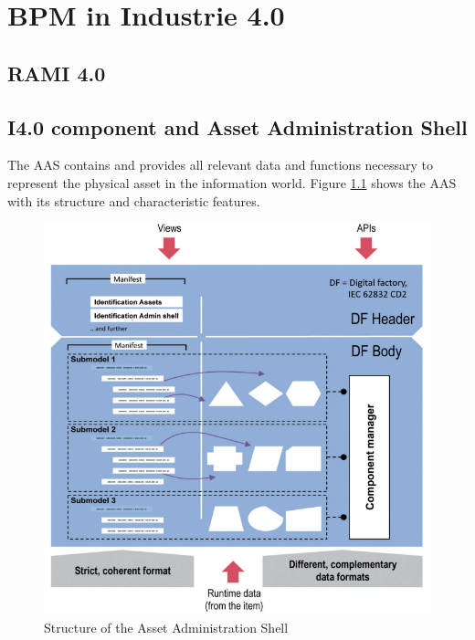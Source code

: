 \chapter{BPM in Industrie 4.0}
\section{RAMI 4.0}

\section{I4.0 component and Asset Administration Shell}

The \ac{AAS} contains and provides all relevant data and functions necessary to represent the physical asset in the information world. Figure \ref{fig:structureaas} shows the \ac{AAS} with its structure and characteristic features.

\begin{figure}[h]
\centering
\includegraphics[scale=0.8]{content/pictures/structure_aas_zvei.png}
\caption{Structure of the Asset Administration Shell}
\label{fig:structureaas}
\end{figure}

